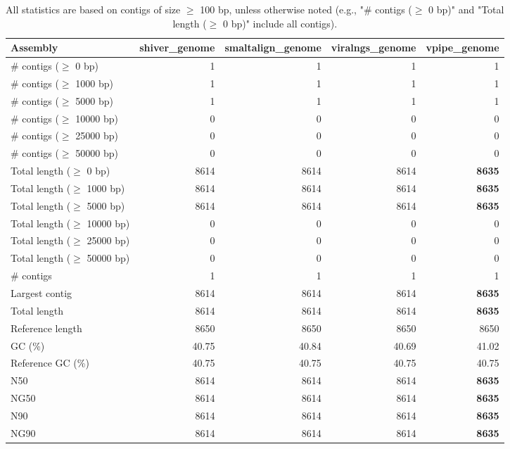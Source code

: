\documentclass[12pt,a4paper]{article}
\begin{document}
\begin{table}[ht]
\begin{center}
\caption{All statistics are based on contigs of size $\geq$ 100 bp, unless otherwise noted (e.g., "\# contigs ($\geq$ 0 bp)" and "Total length ($\geq$ 0 bp)" include all contigs).}
\begin{tabular}{|l*{4}{|r}|}
\hline
Assembly & shiver\_genome & smaltalign\_genome & viralngs\_genome & vpipe\_genome \\ \hline
\# contigs ($\geq$ 0 bp) & 1 & 1 & 1 & 1 \\ \hline
\# contigs ($\geq$ 1000 bp) & 1 & 1 & 1 & 1 \\ \hline
\# contigs ($\geq$ 5000 bp) & 1 & 1 & 1 & 1 \\ \hline
\# contigs ($\geq$ 10000 bp) & 0 & 0 & 0 & 0 \\ \hline
\# contigs ($\geq$ 25000 bp) & 0 & 0 & 0 & 0 \\ \hline
\# contigs ($\geq$ 50000 bp) & 0 & 0 & 0 & 0 \\ \hline
Total length ($\geq$ 0 bp) & 8614 & 8614 & 8614 & {\bf 8635} \\ \hline
Total length ($\geq$ 1000 bp) & 8614 & 8614 & 8614 & {\bf 8635} \\ \hline
Total length ($\geq$ 5000 bp) & 8614 & 8614 & 8614 & {\bf 8635} \\ \hline
Total length ($\geq$ 10000 bp) & 0 & 0 & 0 & 0 \\ \hline
Total length ($\geq$ 25000 bp) & 0 & 0 & 0 & 0 \\ \hline
Total length ($\geq$ 50000 bp) & 0 & 0 & 0 & 0 \\ \hline
\# contigs & 1 & 1 & 1 & 1 \\ \hline
Largest contig & 8614 & 8614 & 8614 & {\bf 8635} \\ \hline
Total length & 8614 & 8614 & 8614 & {\bf 8635} \\ \hline
Reference length & 8650 & 8650 & 8650 & 8650 \\ \hline
GC (\%) & 40.75 & 40.84 & 40.69 & 41.02 \\ \hline
Reference GC (\%) & 40.75 & 40.75 & 40.75 & 40.75 \\ \hline
N50 & 8614 & 8614 & 8614 & {\bf 8635} \\ \hline
NG50 & 8614 & 8614 & 8614 & {\bf 8635} \\ \hline
N90 & 8614 & 8614 & 8614 & {\bf 8635} \\ \hline
NG90 & 8614 & 8614 & 8614 & {\bf 8635} \\ \hline

\end{tabular}
\end{center}
\end{table}
\end{document}
